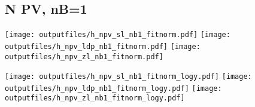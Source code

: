 \documentclass[11pt]{article}
\begin{document}
    \subsection{ N PV, nB=1 }

    \noindent
     \texttt{[image: outputfiles/h\_npv\_sl\_nb1\_fitnorm.pdf]}
     \texttt{[image: outputfiles/h\_npv\_ldp\_nb1\_fitnorm.pdf]}
     \texttt{[image: outputfiles/h\_npv\_zl\_nb1\_fitnorm.pdf]}

    \noindent
     \texttt{[image: outputfiles/h\_npv\_sl\_nb1\_fitnorm\_logy.pdf]}
     \texttt{[image: outputfiles/h\_npv\_ldp\_nb1\_fitnorm\_logy.pdf]}
     \texttt{[image: outputfiles/h\_npv\_zl\_nb1\_fitnorm\_logy.pdf]}





  
\end{document}
